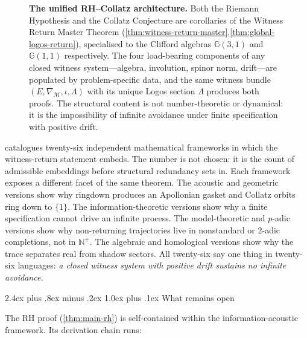 \documentclass[11pt,a4paper]{article}
\makeatletter
\theoremstyle{plain}
\theoremstyle{definition}
\theoremstyle{remark}
\numberwithin{equation}{section}
\newcommand{\Cl}{\mathbb{G}}
\newcommand{\Nat}{\mathbb{N}}
\renewcommand{\subsection}{%
  \@startsection{subsection}{2}{0pt}%
    {2.4ex plus .8ex minus .2ex}%
    {1.0ex plus .1ex}%
    {\normalfont\Large\bfseries\color{headingAccent}}%
}
\makeatother
\begin{document}
\begin{figure}[!htbp]
{\begin{tikzpicture}
\end{tikzpicture}}
\caption{\textbf{The unified RH--Collatz architecture.}  Both the
Riemann Hypothesis and the Collatz Conjecture are corollaries of
the Witness Return Master Theorem
(\cref{thm:witness-return-master},\cref{thm:global-logos-return}),
specialised to the Clifford algebras $\Cl(3,1)$ and $\Cl(1,1)$
respectively.  The four load-bearing components of any closed
witness system---algebra, involution, spinor norm, drift---are
populated by problem-specific data, and the same witness bundle
$(E,\nabla_{\mathcal{M}},\iota,\Lambda)$ with its unique Logos
section $\Lambda$ produces both proofs.  The structural content
is not number-theoretic or dynamical: it is the impossibility of
infinite avoidance under finite specification with positive drift.}
\label{fig:unified-rh-collatz-architecture}
\end{figure}

 catalogues twenty-six independent
mathematical frameworks in which the witness-return statement
embeds.  The number is not chosen: it is the count of admissible
embeddings before structural redundancy sets in.  Each framework
exposes a different facet of the same theorem.  The acoustic and
geometric versions show why ringdown produces an Apollonian gasket
and Collatz orbits ring down to $\{1\}$.  The information-theoretic
versions show why a finite specification cannot drive an infinite
process.  The model-theoretic and $p$-adic versions show why
non-returning trajectories live in nonstandard or 2-adic
completions, not in $\Nat^+$.  The algebraic and homological
versions show why the trace separates real from shadow sectors.
All twenty-six say one thing in twenty-six languages:
\emph{a closed witness system with positive drift sustains no
infinite avoidance.}

\subsection{What remains open}
\label{subsec:what-remains-formal}

The RH proof (\cref{thm:main-rh}) is self-contained within the
information-acoustic framework.  Its derivation chain runs:
\end{document}
